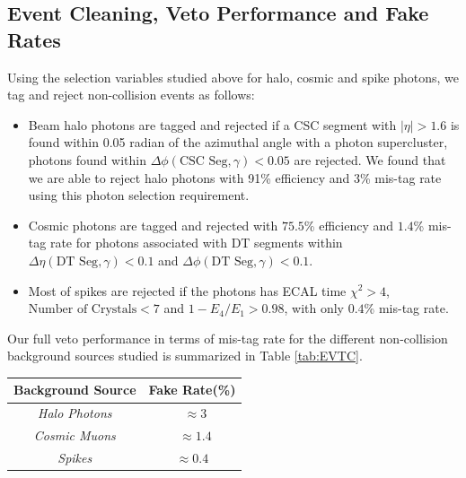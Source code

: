 \subsection{Event Cleaning, Veto Performance and Fake Rates}
Using the selection variables studied above for halo, cosmic and spike photons, we tag and reject non-collision events as follows: 
\begin{itemize}
\item Beam halo photons are tagged and rejected if a CSC segment with $|\eta| > 1.6$ is found within 0.05 radian of the azimuthal angle with a photon supercluster, \ie photons found within $\Delta\phi(\mbox{CSC Seg},\gamma) < 0.05$ are rejected. We found that we are able to reject halo photons with 91\% efficiency and 3\% mis-tag rate using this photon selection requirement.
\item Cosmic photons are tagged and rejected with $75.5$\% efficiency and $1.4$\% mis-tag rate for photons associated with DT segments within $\Delta\eta(\mbox{DT Seg},\gamma) < 0.1$ and $\Delta\phi(\mbox{DT Seg},\gamma) < 0.1$.
\item Most of spikes are rejected if the photons has ECAL time $\chi^{2} > 4$, $\mbox{Number of Crystals} < 7$ and $ 1-E_{4}/E_{1} > 0.98$, with only $0.4$\% mis-tag rate.
\end{itemize}
Our full veto performance in terms of mis-tag rate for the different non-collision background sources studied  is summarized in Table \ref{tab:EVTC}.

\begin{minipage}{0.90\linewidth} 
\begin{center}
\begin{tabular}{|c| c|}
\hline
\bfseries{Background Source} & \bfseries {Fake Rate}(\%)\\
\hline\hline
\textit{Halo Photons} & ~$\approx 3$ \\
\textit{Cosmic Muons} & ~$\approx 1.4$ \\
\textit{Spikes} & $\approx 0.4$ \\
\hline
\end{tabular}
\label{tab:EVTC} 
\end{center}
\end{minipage}

